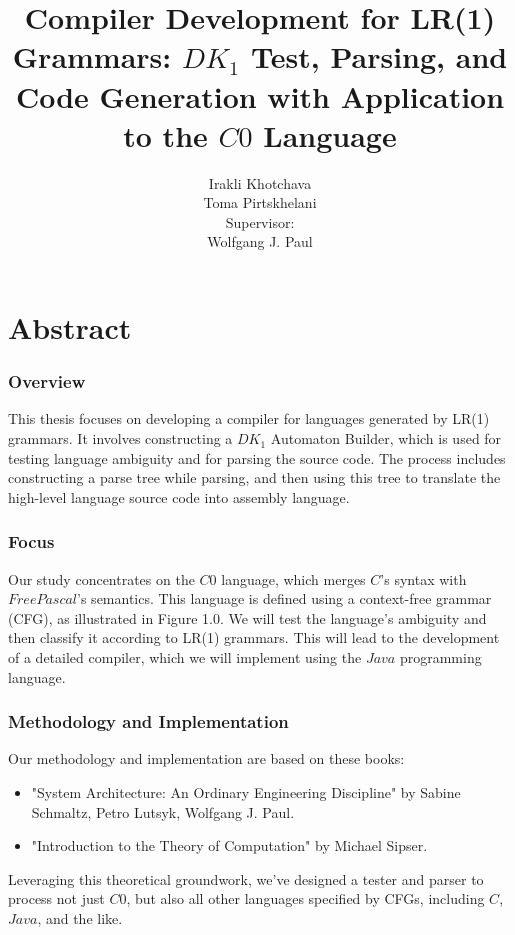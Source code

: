 \documentclass[11pt]{report}
\title{Compiler Development for LR(1) Grammars: \(DK_{1}\) Test, Parsing, and Code Generation with Application to the \(C0\) Language\\ \vspace{10pt}{\Large Kutaisi International University}}
\author{Irakli Khotchava\\Toma Pirtskhelani \vspace{30pt}\\ Supervisor:\\ Wolfgang J. Paul}
\date{}
\begin{document}
    \maketitle
    \chapter*{Abstract}

    \subsection*{Overview}
    This thesis focuses on developing a compiler for languages generated by LR(1) grammars. It involves constructing a \(DK_{1}\) Automaton Builder, which is used for testing language ambiguity and for parsing the source code. The process includes constructing a parse tree while parsing, and then using this tree to translate the high-level language source code into assembly language.

    \subsection*{Focus}
    Our study concentrates on the \(C0\) language, which merges \(C\)'s syntax with \(Free Pascal\)'s semantics. This language is defined using a context-free grammar (CFG), as illustrated in Figure 1.0. We will test the language's ambiguity and then classify it according to LR(1) grammars. This will lead to the development of a detailed compiler, which we will implement using the \(Java\) programming language.

    \subsection*{Methodology and Implementation}
    Our methodology and implementation are based on these books:
    \begin{itemize}
        \item "System Architecture: An Ordinary Engineering Discipline" by Sabine Schmaltz, Petro Lutsyk, Wolfgang J. Paul. \cite{sysbook}
        \item "Introduction to the Theory of Computation"
        by Michael Sipser. \cite{sipser}
    \end{itemize}
    \setlength{\parindent}{0pt}

    Leveraging this theoretical groundwork, we've designed a tester and parser to process not just \(C0\), but also all other languages specified by CFGs, including \(C\), \(Java\), and the like.
\end{document}
